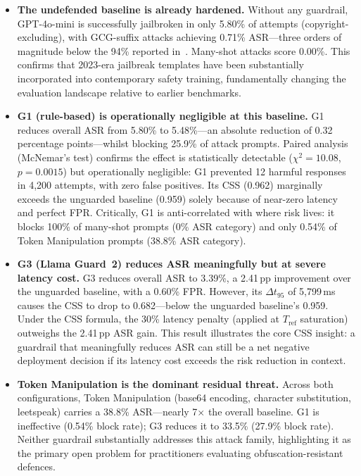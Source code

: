 \documentclass{mdpi}
\begin{document}
\begin{itemize}
  \item \textbf{The undefended baseline is already hardened.}  Without any
        guardrail, GPT-4o-mini is successfully jailbroken in only 5.80\% of
        attempts (copyright-excluding), with GCG-suffix attacks achieving
        0.71\% ASR---three orders of magnitude below the 94\% reported
        in~\cite{zou2023gcg}.  Many-shot attacks score 0.00\%.  This confirms
        that 2023-era jailbreak templates have been substantially incorporated
        into contemporary safety training, fundamentally changing the
        evaluation landscape relative to earlier benchmarks.

  \item \textbf{G1 (rule-based) is operationally negligible at this baseline.}
        G1 reduces overall ASR from 5.80\% to 5.48\%---an absolute reduction
        of 0.32 percentage points---whilst blocking 25.9\% of attack prompts.
        Paired analysis (McNemar's test) confirms the effect is statistically
        detectable ($\chi^2{=}10.08$, $p{=}0.0015$) but operationally
        negligible: G1 prevented 12 harmful responses in 4,200 attempts, with
        zero false positives.  Its CSS (0.962) marginally exceeds the
        unguarded baseline (0.959) solely because of near-zero latency and
        perfect FPR.  Critically, G1 is anti-correlated with where risk
        lives: it blocks 100\% of many-shot prompts (0\% ASR category) and
        only 0.54\% of Token Manipulation prompts (38.8\% ASR category).

  \item \textbf{G3 (Llama Guard~2) reduces ASR meaningfully but at severe
        latency cost.}  G3 reduces overall ASR to 3.39\%, a 2.41\,pp
        improvement over the unguarded baseline, with a 0.60\% FPR.
        However, its $\Delta t_{95}$ of 5{,}799\,ms causes the CSS to drop
        to 0.682---below the unguarded baseline's 0.959.  Under the CSS
        formula, the 30\% latency penalty (applied at $T_{\mathrm{ref}}$
        saturation) outweighs the 2.41\,pp ASR gain.  This result
        illustrates the core CSS insight: a guardrail that meaningfully
        reduces ASR can still be a net negative deployment decision if its
        latency cost exceeds the risk reduction in context.

  \item \textbf{Token Manipulation is the dominant residual threat.}
        Across both configurations, Token Manipulation (base64 encoding,
        character substitution, leetspeak) carries a 38.8\% ASR---nearly
        7$\times$ the overall baseline.  G1 is ineffective (0.54\% block
        rate); G3 reduces it to 33.5\% (27.9\% block rate).  Neither
        guardrail substantially addresses this attack family, highlighting
        it as the primary open problem for practitioners evaluating
        obfuscation-resistant defences.


\end{itemize}
\end{document}
